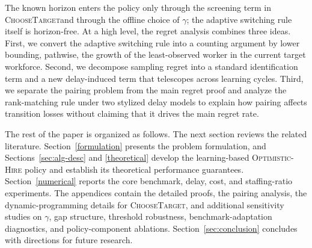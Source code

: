 \documentclass[opre,blindrev]{informs3}
\newcommand{\ChooseTarget}{\textsc{ChooseTarget}}
\begin{document}

The known horizon enters the policy only through the screening term in \ChooseTarget and through the offline choice of \(\gamma\); the adaptive switching rule itself is horizon-free. At a high level, the regret analysis combines three ideas. First, we convert the adaptive switching rule into a counting argument by lower bounding, pathwise, the growth of the least-observed worker in the current target workforce. Second, we decompose sampling regret into a standard identification term and a new delay-induced term that telescopes across learning cycles. Third, we separate the pairing problem from the main regret proof and analyze the rank-matching rule under two stylized delay models to explain how pairing affects transition losses without claiming that it drives the main regret rate.

The rest of the paper is organized as follows. The next section reviews the related literature. Section~\ref{formulation} presents the problem formulation, and Sections~\ref{sec:alg-desc} and \ref{theoretical} develop the learning-based \textsc{Optimistic-Hire} policy and establish its theoretical performance guarantees. Section~\ref{numerical} reports the core benchmark, delay, cost, and staffing-ratio experiments. The appendices contain the detailed proofs, the pairing analysis, the dynamic-programming details for \ChooseTarget, and additional sensitivity studies on \(\gamma\), gap structure, threshold robustness, benchmark-adaptation diagnostics, and policy-component ablations. Section~\ref{sec:conclusion} concludes with directions for future research.
\end{document}

